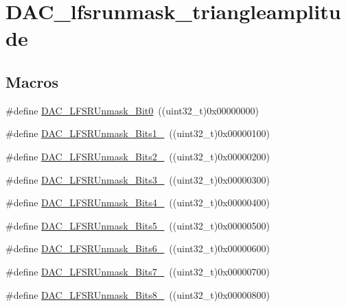 \hypertarget{group___d_a_c__lfsrunmask__triangleamplitude}{\section{D\-A\-C\-\_\-lfsrunmask\-\_\-triangleamplitude}
\label{group___d_a_c__lfsrunmask__triangleamplitude}
}
\subsection*{Macros}
\begin{DoxyCompactItemize}
\item 
\#define \hyperlink{group___d_a_c__lfsrunmask__triangleamplitude_ga60794fd5092a332cfa82e1cee13945fc}{D\-A\-C\-\_\-\-L\-F\-S\-R\-Unmask\-\_\-\-Bit0}~((uint32\-\_\-t)0x00000000)
\item 
\#define \hyperlink{group___d_a_c__lfsrunmask__triangleamplitude_ga09f47cfa563252a1add4662284350c07}{D\-A\-C\-\_\-\-L\-F\-S\-R\-Unmask\-\_\-\-Bits1\-\_}~((uint32\-\_\-t)0x00000100)
\item 
\#define \hyperlink{group___d_a_c__lfsrunmask__triangleamplitude_ga60b800857b7e33d9c0be2846fc56849f}{D\-A\-C\-\_\-\-L\-F\-S\-R\-Unmask\-\_\-\-Bits2\-\_}~((uint32\-\_\-t)0x00000200)
\item 
\#define \hyperlink{group___d_a_c__lfsrunmask__triangleamplitude_gafe219362b3a48d8678a65ef38cb45532}{D\-A\-C\-\_\-\-L\-F\-S\-R\-Unmask\-\_\-\-Bits3\-\_}~((uint32\-\_\-t)0x00000300)
\item 
\#define \hyperlink{group___d_a_c__lfsrunmask__triangleamplitude_ga2543d802e19d592a26c8231be663cdac}{D\-A\-C\-\_\-\-L\-F\-S\-R\-Unmask\-\_\-\-Bits4\-\_}~((uint32\-\_\-t)0x00000400)
\item 
\#define \hyperlink{group___d_a_c__lfsrunmask__triangleamplitude_ga71a01660d410823bfe76a603080dc125}{D\-A\-C\-\_\-\-L\-F\-S\-R\-Unmask\-\_\-\-Bits5\-\_}~((uint32\-\_\-t)0x00000500)
\item 
\#define \hyperlink{group___d_a_c__lfsrunmask__triangleamplitude_ga48fe2d3f4274d6bf28e446ca0001ed5d}{D\-A\-C\-\_\-\-L\-F\-S\-R\-Unmask\-\_\-\-Bits6\-\_}~((uint32\-\_\-t)0x00000600)
\item 
\#define \hyperlink{group___d_a_c__lfsrunmask__triangleamplitude_gaf0a93c1ee1e13776fae7558b36243431}{D\-A\-C\-\_\-\-L\-F\-S\-R\-Unmask\-\_\-\-Bits7\-\_}~((uint32\-\_\-t)0x00000700)
\item 
\#define \hyperlink{group___d_a_c__lfsrunmask__triangleamplitude_ga4f56965841d9d91ca5b6de43ee589598}{D\-A\-C\-\_\-\-L\-F\-S\-R\-Unmask\-\_\-\-Bits8\-\_}~((uint32\-\_\-t)0x00000800)

\end{DoxyCompactItemize}
